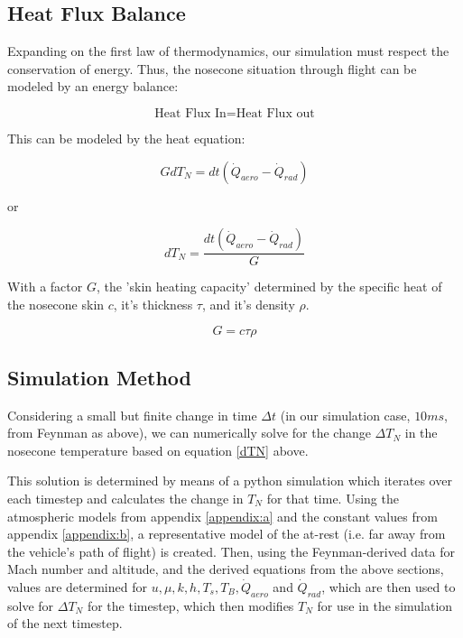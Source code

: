 \documentclass[twocolumn]{article}
\begin{document}
        \subsection{Heat Flux Balance}
            Expanding on the first law of thermodynamics, our simulation must 
            respect the conservation of energy. Thus, the nosecone situation 
            through flight can be modeled by an energy balance:

            \[\textrm{Heat Flux In} = \textrm{Heat Flux out}\]

            This can be modeled by the heat equation:

            \[G dT_N = dt(\dot{Q}_{aero}-\dot{Q}_{rad})\]

            or 

            \begin{equation}
                \label{dTN}
                dT_N = \frac{dt(\dot{Q}_{aero}-\dot{Q}_{rad})}{G}
            \end{equation}

            With a factor $G$, the 'skin heating capacity' \cite{naca:skintemp}
            determined by the specific heat of the nosecone skin $c$, it's 
            thickness $\tau$, and it's density $\rho$.

            \[G=c\tau\rho\]

        \subsection{Simulation Method}

            Considering a small but finite change in time $\Delta t$ (in our 
            simulation case, $10ms$, from Feynman as above), we can
            numerically solve for the change $\Delta T_N$ in the nosecone
            temperature based on equation \ref{dTN} above. 

            This solution is determined by means of a python simulation which
            iterates over each timestep and calculates the change in $T_N$
            for that time. Using the atmospheric models from appendix 
            \ref{appendix:a} and the constant values from appendix 
            \ref{appendix:b}, a representative model of the at-rest (i.e. far
            away from the vehicle's path of flight) is created. Then, using the 
            Feynman-derived data for Mach number and altitude, and the derived
            equations from the above sections, values are determined for $u,
            \mu, k, h, T_s, T_B, \dot{Q}_{aero}$ and $\dot{Q}_{rad}$, which are
            then used to solve for $\Delta T_N$ for the timestep, which then
            modifies $T_N$ for use in the simulation of the next timestep.
\end{document}

